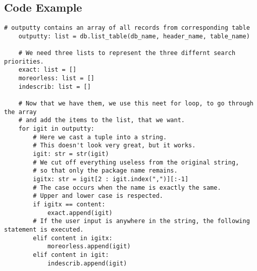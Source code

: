 \documentclass[fleqn,10pt]{olplainarticle}
\begin{document}
\subsection{Code Example}
\begin{lstlisting}[breaklines=true]
  # outputty contains an array of all records from corresponding table
    outputty: list = db.list_table(db_name, header_name, table_name)

    # We need three lists to represent the three differnt search priorities.
    exact: list = []
    moreorless: list = []
    indescrib: list = []

    # Now that we have them, we use this neet for loop, to go through the array
    # and add the items to the list, that we want.
    for igit in outputty:
        # Here we cast a tuple into a string.
        # This doesn't look very great, but it works.
        igit: str = str(igit)
        # We cut off everything useless from the original string,
        # so that only the package name remains.
        igitx: str = igit[2 : igit.index(",")][:-1]
        # The case occurs when the name is exactly the same.
        # Upper and lower case is respected.
        if igitx == content:
            exact.append(igit)
        # If the user input is anywhere in the string, the following statement is executed.
        elif content in igitx:
            moreorless.append(igit)
        elif content in igit:
            indescrib.append(igit)
\end{lstlisting}
\end{document}
